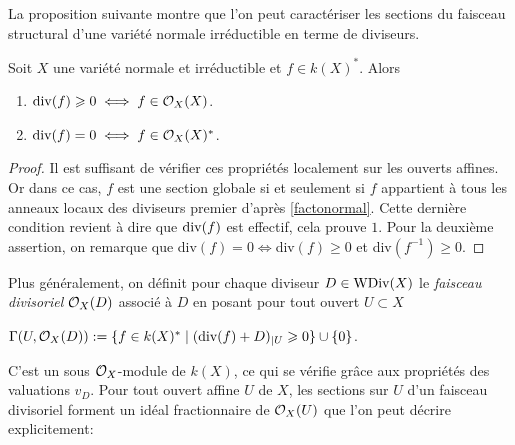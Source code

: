 La proposition suivante montre que l'on peut caractériser les sections du faisceau structural d'une variété normale irréductible en terme de diviseurs.

\begin{prop}\label{caracfaisceaustructdiv}
Soit $X$ une variété normale et irréductible et $f\in k(X)^*$. Alors 
\begin{enumerate}
\item $\operatorname{div}(f)\geqslant 0\iff f \in\mathcal{O}_X(X)$.
\item $\operatorname{div}(f)= 0\iff f\in\mathcal{O}_X(X)^*$.
\end{enumerate}
\end{prop}
\begin{proof}
Il est suffisant de vérifier ces propriétés localement sur les ouverts affines. Or dans ce cas, $f$ est une section globale si et seulement si $f$ appartient à tous les anneaux locaux des diviseurs premier d'après \ref{factonormal}. Cette dernière condition revient à dire que $\operatorname{div}(f)$ est effectif, cela prouve $1$. Pour la deuxième assertion, on remarque que div$(f)=0\iff$div$(f)\geq 0$ et div$(f^{-1})\geq 0$.
\end{proof}

Plus généralement, on définit pour chaque diviseur $D\in \operatorname{WDiv}(X)$ le \textit{faisceau divisoriel} $\mathcal{O}_X(D)$ associé à $D$ en posant pour tout ouvert $U\subset X$
\begin{center}
$\Gamma(U,\mathcal{O}_X(D)):=\lbrace f\in k(X)^* \mid (\textrm{div}(f)+D)_{|U}\geqslant 0\rbrace\cup \lbrace 0 \rbrace$.
\end{center}
C'est un sous $\mathcal{O}_X$-module de $k(X)$, ce qui se vérifie grâce aux propriétés des valuations $v_D$. Pour tout ouvert affine $U$ de $X$, les sections sur $U$ d'un faisceau divisoriel forment un idéal fractionnaire de $\mathcal{O}_X(U)$ que l'on peut décrire explicitement:

